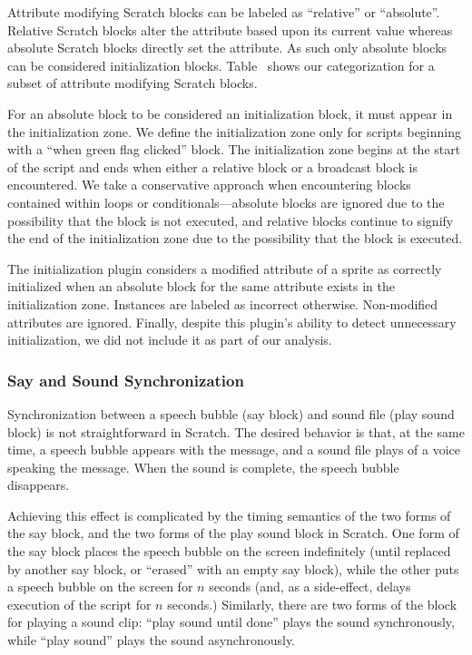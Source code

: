 Attribute modifying Scratch blocks can be labeled as ``relative'' or
``absolute''. Relative Scratch blocks alter the attribute based upon its
current value whereas absolute Scratch blocks directly set the attribute. As
such only absolute blocks can be considered initialization
blocks. Table~ shows our categorization for a
subset of attribute modifying Scratch blocks.

For an absolute block to be considered an initialization block, it must appear
in the initialization zone. We define the initialization zone only for scripts
beginning with a ``when green flag clicked'' block. The initialization zone
begins at the start of the script and ends when either a relative block or a
broadcast block is encountered. We take a conservative approach when
encountering blocks contained within loops or conditionals---absolute blocks
are ignored due to the possibility that the block is not executed, and relative
blocks continue to signify the end of the initialization zone due to the
possibility that the block is executed.

The initialization plugin considers a modified attribute of a sprite as
correctly initialized when an absolute block for the same attribute exists in
the initialization zone. Instances are labeled as incorrect
otherwise. Non-modified attributes are ignored. Finally, despite this plugin's
ability to detect unnecessary initialization, we did not include it as part of
our analysis.


\subsubsection*{Say and Sound Synchronization}
Synchronization between a speech bubble (say block) and sound file (play sound
block) is not straightforward in Scratch.  The desired behavior is that, at the
same time, a speech bubble appears with the message, and a sound file plays of
a voice speaking the message.  When the sound is complete, the speech bubble
disappears.

Achieving this effect is complicated by the timing semantics of the two forms
of the say block, and the two forms of the play sound block in Scratch.  One
form of the say block places the speech bubble on the screen indefinitely
(until replaced by another say block, or ``erased'' with an empty say block),
while the other puts a speech bubble on the screen for $n$ seconds (and, as a
side-effect, delays execution of the script for $n$ seconds.)  Similarly, there
are two forms of the block for playing a sound clip: ``play sound until done''
plays the sound synchronously, while ``play sound'' plays the sound
asynchronously.


